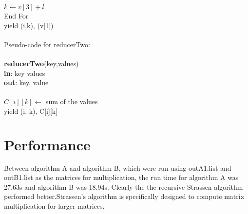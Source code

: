 \documentclass[10pt,a4paper]{article}
\begin{document}
	\indent\indent  $k \leftarrow v[3]+l$\\
End For\\
yield (i,k), (v[1])\\
\\Pseudo-code for reducerTwo:\\ \\ 
\textbf{reducerTwo}(key,values)\\
\textbf{in}: key values\\
\textbf{out}: key, value\\\\
$C[i][k] \leftarrow$ sum of the values \\
	yield (i, k), C[i][k] \\
	
	
\section{Performance}

Between algorithm A and algorithm B, which were run using outA1.list and outB1.list as the matrices for multiplication, the run time for algorithm A was 27.63s and algorithm B was 18.94s. Clearly the the recursive Strassen algorithm performed better.Strassen's algorithm is specifically designed to compute matrix multiplication for larger matrices. 
\end{document}
